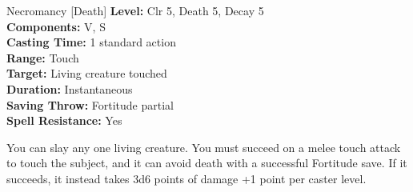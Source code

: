 {Necromancy [Death]}
{
	\textbf{Level:}
	Clr 5, Death 5, Decay 5\\
	\textbf{Components:}
	V, S\\
	\textbf{Casting Time:}
	1 standard action\\
	\textbf{Range:}
	Touch\\
	\textbf{Target:}
	Living creature touched\\
	\textbf{Duration:}
	Instantaneous\\
	\textbf{Saving Throw:}
	Fortitude partial\\
	\textbf{Spell Resistance:}
	Yes\\
}
{
	You can slay any one living creature. You must succeed on a melee touch attack to touch the subject, and it can avoid death with a successful Fortitude save. If it succeeds, it instead takes 3d6 points of damage +1 point per caster level.

}
